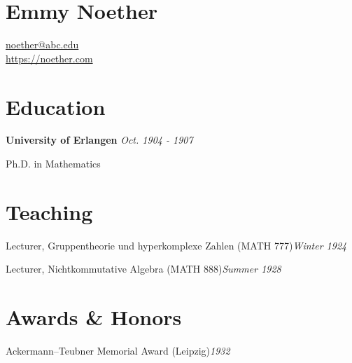 \documentclass[10pt]{article}
\title{}
\author{}
\date{}
\newcommand{\job}[2]{\textsf{\textbf{#1}} \dotfill \textit{#2}}
\newcommand{\details}[2]{\par #1\hfill #2 \vspace{0.2cm}}
\newcommand{\course}[3]{\par #1 ({\footnotesize #2})\dotfill \textit{#3}}
\begin{document}
%
%
\section*{\Large{Emmy Noether}}
{\color{Base02}
\href{mailto:noether@abc.edu}{noether@abc.edu} \\
\href{https://noether.com}{https://noether.com}
}


\section*{Education}
\job{University of Erlangen}{Oct. 1904 - 1907}
\details{Ph.D. in Mathematics}{}

\vspace{-.2cm}

\begin{refsection}
    \nocite{
        noether_21,
        noether_18,
    }
    \printbibliography[title={Publications}]
\end{refsection}
\vspace{-1em}

\begin{refsection}
    \nocite{
        noether_talk,
    }
    \printbibliography[title={Talks}]
\end{refsection}

\vspace{-.2cm}

\section*{Teaching}
\course{Lecturer, Gruppentheorie und hyperkomplexe Zahlen}{MATH 777}{Winter 1924}
\course{Lecturer, Nichtkommutative Algebra}{MATH 888}{Summer 1928}

\section*{Awards \& Honors}
\course{Ackermann–Teubner Memorial Award}{Leipzig}{1932}
\end{document}
